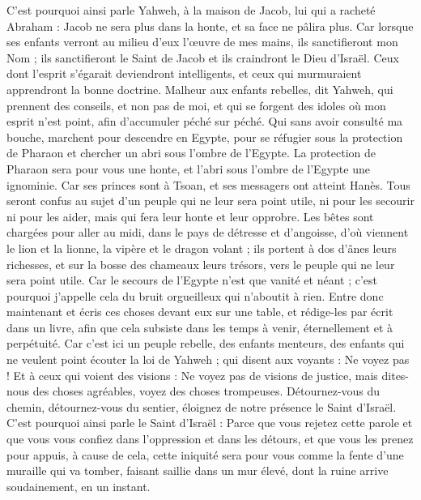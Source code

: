 \begin{multicols}{2}
C'est pourquoi ainsi parle Yahweh, à la maison de Jacob, lui qui a racheté Abraham : Jacob ne sera plus dans la honte, et sa face ne pâlira plus.
Car lorsque ses enfants verront au milieu d'eux l'œuvre de mes mains, ils sanctifieront mon Nom ; ils sanctifieront le Saint de Jacob et ils craindront le Dieu d'Israël.
Ceux dont l'esprit s'égarait deviendront intelligents, et ceux qui murmuraient apprendront la bonne doctrine.
\VerseOne{}Malheur aux enfants rebelles, dit Yahweh, qui prennent des conseils, et non pas de moi, et qui se forgent des idoles où mon esprit n'est point, afin d'accumuler péché sur péché.
Qui sans avoir consulté ma bouche, marchent pour descendre en Egypte, pour se réfugier sous la protection de Pharaon et chercher un abri sous l'ombre de l'Egypte.
La protection de Pharaon sera pour vous une honte, et l'abri sous l'ombre de l'Egypte une ignominie.
Car ses princes sont à Tsoan, et ses messagers ont atteint Hanès.
Tous seront confus au sujet d'un peuple qui ne leur sera point utile, ni pour les secourir ni pour les aider, mais qui fera leur honte et leur opprobre.
Les bêtes sont chargées pour aller au midi, dans le pays de détresse et d'angoisse, d'où viennent le lion et la lionne, la vipère et le dragon volant ; ils portent à dos d'ânes leurs richesses, et sur la bosse des chameaux leurs trésors, vers le peuple qui ne leur sera point utile.
Car le secours de l'Egypte n'est que vanité et néant ; c'est pourquoi j'appelle cela du bruit orgueilleux qui n'aboutit à rien.
Entre donc maintenant et écris ces choses devant eux sur une table, et rédige-les par écrit dans un livre, afin que cela subsiste dans les temps à venir, éternellement et à perpétuité.
Car c'est ici un peuple rebelle, des enfants menteurs, des enfants qui ne veulent point écouter la loi de Yahweh ;
qui disent aux voyants : Ne voyez pas ! Et à ceux qui voient des visions : Ne voyez pas de visions de justice, mais dites-nous des choses agréables, voyez des choses trompeuses.
Détournez-vous du chemin, détournez-vous du sentier, éloignez de notre présence le Saint d'Israël.
C'est pourquoi ainsi parle le Saint d'Israël : Parce que vous rejetez cette parole et que vous vous confiez dans l'oppression et dans les détours, et que vous les prenez pour appuis,
à cause de cela, cette iniquité sera pour vous comme la fente d'une muraille qui va tomber, faisant saillie dans un mur élevé, dont la ruine arrive soudainement, en un instant.

\end{multicols}
